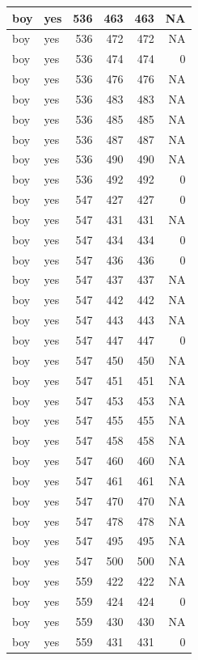 \documentclass[man]{apa6}
\begin{document}
\begin{tabular}{l|l|r|r|r|r}
\hline
boy & yes & 536 & 463 & 463 & NA\\
\hline
boy & yes & 536 & 472 & 472 & NA\\
\hline
boy & yes & 536 & 474 & 474 & 0\\
\hline
boy & yes & 536 & 476 & 476 & NA\\
\hline
boy & yes & 536 & 483 & 483 & NA\\
\hline
boy & yes & 536 & 485 & 485 & NA\\
\hline
boy & yes & 536 & 487 & 487 & NA\\
\hline
boy & yes & 536 & 490 & 490 & NA\\
\hline
boy & yes & 536 & 492 & 492 & 0\\
\hline
boy & yes & 547 & 427 & 427 & 0\\
\hline
boy & yes & 547 & 431 & 431 & NA\\
\hline
boy & yes & 547 & 434 & 434 & 0\\
\hline
boy & yes & 547 & 436 & 436 & 0\\
\hline
boy & yes & 547 & 437 & 437 & NA\\
\hline
boy & yes & 547 & 442 & 442 & NA\\
\hline
boy & yes & 547 & 443 & 443 & NA\\
\hline
boy & yes & 547 & 447 & 447 & 0\\
\hline
boy & yes & 547 & 450 & 450 & NA\\
\hline
boy & yes & 547 & 451 & 451 & NA\\
\hline
boy & yes & 547 & 453 & 453 & NA\\
\hline
boy & yes & 547 & 455 & 455 & NA\\
\hline
boy & yes & 547 & 458 & 458 & NA\\
\hline
boy & yes & 547 & 460 & 460 & NA\\
\hline
boy & yes & 547 & 461 & 461 & NA\\
\hline
boy & yes & 547 & 470 & 470 & NA\\
\hline
boy & yes & 547 & 478 & 478 & NA\\
\hline
boy & yes & 547 & 495 & 495 & NA\\
\hline
boy & yes & 547 & 500 & 500 & NA\\
\hline
boy & yes & 559 & 422 & 422 & NA\\
\hline
boy & yes & 559 & 424 & 424 & 0\\
\hline
boy & yes & 559 & 430 & 430 & NA\\
\hline
boy & yes & 559 & 431 & 431 & 0\\

\end{tabular}
\end{document}
